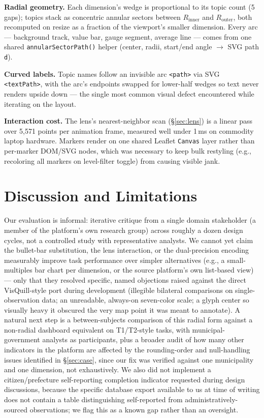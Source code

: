 \documentclass[10pt,twocolumn]{article}
\begin{document}
\textbf{Radial geometry.} Each dimension's wedge is proportional to its topic count (5\textdegree{} gaps); topics stack as concentric annular sectors between $R_{\text{inner}}$ and $R_{\text{outer}}$, both recomputed on resize as a fraction of the viewport's smaller dimension. Every arc — background track, value bar, gauge segment, average line — comes from one shared \texttt{annularSectorPath()} helper (center, radii, start/end angle $\rightarrow$ SVG path \texttt{d}).

\textbf{Curved labels.} Topic names follow an invisible arc \texttt{<path>} via SVG \texttt{<textPath>}, with the arc's endpoints swapped for lower-half wedges so text never renders upside down — the single most common visual defect encountered while iterating on the layout.

\textbf{Interaction cost.} The lens's nearest-neighbor scan (\S\ref{sec:lens}) is a linear pass over 5{,}571 points per animation frame, measured well under 1\,ms on commodity laptop hardware. Markers render on one shared Leaflet \texttt{Canvas} layer rather than per-marker DOM/SVG nodes, which was necessary to keep bulk restyling (e.g., recoloring all markers on level-filter toggle) from causing visible jank.

\section{Discussion and Limitations}
Our evaluation is informal: iterative critique from a single domain stakeholder (a member of the platform's own research group) across roughly a dozen design cycles, not a controlled study with representative analysts. We cannot yet claim the bullet-bar substitution, the lens interaction, or the dual-precision encoding measurably improve task performance over simpler alternatives (e.g., a small-multiples bar chart per dimension, or the source platform's own list-based view) — only that they resolved specific, named objections raised against the direct VisQuill-style port during development (illegible bilateral comparisons on single-observation data; an unreadable, always-on seven-color scale; a glyph center so visually heavy it obscured the very map point it was meant to annotate). A natural next step is a between-subjects comparison of this radial form against a non-radial dashboard equivalent on T1/T2-style tasks, with municipal-government analysts as participants, plus a broader audit of how many other indicators in the platform are affected by the rounding-order and null-handling issues identified in \S\ref{sec:case}, since our fix was verified against one municipality and one dimension, not exhaustively. We also did not implement a citizen/prefecture self-reporting completion indicator requested during design discussions, because the specific database export available to us at time of writing does not contain a table distinguishing self-reported from administratively-sourced observations; we flag this as a known gap rather than an oversight.
\end{document}
